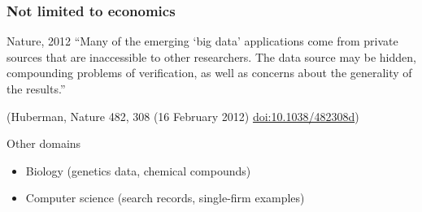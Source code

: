 \begin{frame}
	
\end{frame}

\begin{frame}
	\frametitle{Not limited to economics}
	\begin{block}{Nature, 2012}
		``Many of the emerging `big data' applications come from private sources that are inaccessible to other researchers. The data source may be hidden, compounding problems of verification, as well as concerns about the generality of the results.''\\
	\end{block}
	{\tiny (Huberman, Nature 482, 308 (16 February 2012) \href{http://dx.doi.org/10.1038/482308d}{doi:10.1038/482308d})}
	\begin{block}{Other domains}
		\begin{itemize}
			\item Biology (genetics data, chemical compounds)
			\item Computer science (search records, single-firm examples)
		\end{itemize}
	\end{block}
\end{frame}


